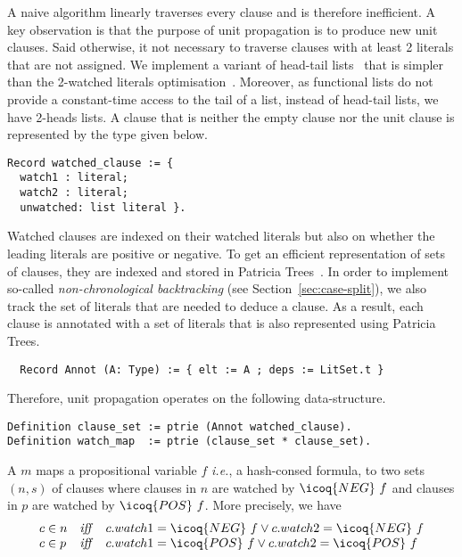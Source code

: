 \documentclass[utf8,a4paper,UKenglish,cleveref, autoref, thm-restate]{lipics-v2019}
\begin{document}
A naive algorithm linearly traverses every clause and is therefore inefficient.
%
A key observation is that the purpose of unit propagation is
to produce new unit clauses. Said otherwise, it not necessary to traverse
clauses with at least 2 literals that are not assigned.
%
We implement a variant of head-tail
lists~\cite{Zhang96anefficient,ZhangS00} that is simpler than the
2-watched literals optimisation~\cite{MoskewiczMZZM01}.
%
Moreover, as functional lists do not provide a constant-time access to the
tail of a list, instead of head-tail lists, we have 2-heads lists.
%
A clause that is neither the empty clause nor the unit clause is
represented by the type  given below.
\begin{verbatim}
Record watched_clause := {
  watch1 : literal;
  watch2 : literal;
  unwatched: list literal }.
\end{verbatim}
Watched clauses are indexed on their watched literals but also on whether the leading literals are positive or negative.
%
To get an efficient representation of sets of clauses, they are indexed and stored in Patricia Trees~\cite{Okasaki98fastmergeable}. 
%
In order to implement so-called \emph{non-chronological backtracking} (see Section~\ref{sec:case-split}),
we also track the set of literals that are needed to deduce a clause. As a
result, each clause is annotated  with a set of literals  that is also
represented using Patricia Trees.
\begin{verbatim}
  Record Annot (A: Type) := { elt := A ; deps := LitSet.t }
\end{verbatim}
Therefore, unit propagation
operates on the following  data-structure.
\begin{verbatim}
Definition clause_set := ptrie (Annot watched_clause).
Definition watch_map  := ptrie (clause_set * clause_set).
\end{verbatim}
A  $m$ maps a propositional variable $f$ \emph{i.e.},
a hash-consed formula, to two sets $(n,s)$ of clauses where clauses in $n$ are watched by $\icoq{NEG}\ f$ and clauses in $p$ 
are watched  by $\icoq{POS}\ f$. More precisely, we have
\[
  \begin{array}{lcl}
    c \in n &\mathit{ iff }& c.watch1=\icoq{NEG}\ f \lor c.watch2=\icoq{NEG}\ f \\
    c \in p &\mathit{ iff }& c.watch1=\icoq{POS}\ f \lor c.watch2=\icoq{POS}\ f \\
  \end{array}
\]
\end{document}
